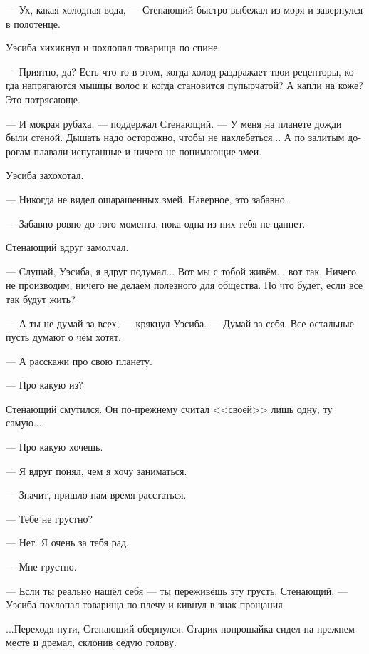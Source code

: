 \documentclass[a4paper,12pt,fleqn]{book}\usepackage{cooltooltips}\usepackage{polyglossia}\setdefaultlanguage[babelshorthands=true]{russian}\setotherlanguage{english}\defaultfontfeatures{Ligatures=TeX,Mapping=tex-text} \usepackage{xcolor}\definecolor{lightgray}{HTML}{bbbbbb}\color{lightgray}\newcommand{\ml}[3]{\textenglish{\textcolor{black}{#3}}}
\newcommand{\asterism}{\vspace{1em}{\centering\Large\bfseries$\ast~\ast~\ast$\par}\vspace{1em}}
\begin{document}
--- Ух, какая холодная вода, --- Стенающий быстро выбежал из моря и завернулся в полотенце.

Уэсиба хихикнул и похлопал товарища по спине.

--- Приятно, да?
Есть что-то в этом, когда холод раздражает твои рецепторы, когда напрягаются мышцы волос и когда становится пупырчатой?
А капли на коже?
Это потрясающе.

--- И мокрая рубаха, --- поддержал Стенающий.
--- У меня на планете дожди были стеной.
Дышать надо осторожно, чтобы не нахлебаться...
А по залитым дорогам плавали испуганные и ничего не понимающие змеи.

Уэсиба захохотал.

--- Никогда не видел ошарашенных змей.
Наверное, это забавно.

--- Забавно ровно до того момента, пока одна из них тебя не цапнет.

Стенающий вдруг замолчал.

--- Слушай, Уэсиба, я вдруг подумал...
Вот мы с тобой живём... вот так.
Ничего не производим, ничего не делаем полезного для общества.
Но что будет, если все так будут жить?

--- А ты не думай за всех, --- крякнул Уэсиба.
--- Думай за себя.
Все остальные пусть думают о чём хотят.

--- А расскажи про свою планету.

--- Про какую из?

Стенающий смутился.
Он по-прежнему считал <<своей>> лишь одну, ту самую...

--- Про какую хочешь.

\asterism

--- Я вдруг понял, чем я хочу заниматься.

--- Значит, пришло нам время расстаться.

--- Тебе не грустно?

--- Нет.
Я очень за тебя рад.

--- Мне грустно.

--- Если ты реально нашёл себя --- ты переживёшь эту грусть, Стенающий, --- Уэсиба похлопал товарища по плечу и кивнул в знак прощания.

...Переходя пути, Стенающий обернулся.
Старик-попрошайка сидел на прежнем месте и дремал, склонив седую голову.
\end{document}
